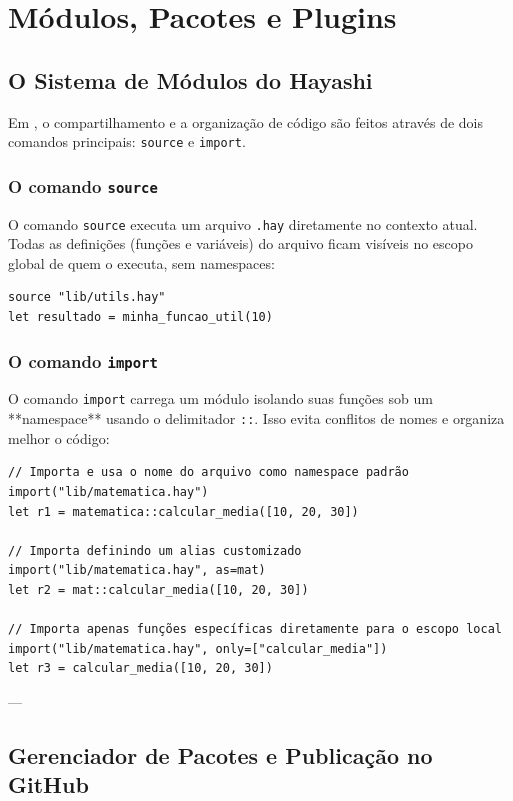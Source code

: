 \chapter{Módulos, Pacotes e Plugins}

\section{O Sistema de Módulos do Hayashi}

Em \hayashi{}, o compartilhamento e a organização de código são feitos através de dois comandos principais: \lstinline{source} e \lstinline{import}.

\subsection{O comando \texttt{source}}
O comando \lstinline{source} executa um arquivo \texttt{.hay} diretamente no contexto atual. Todas as definições (funções e variáveis) do arquivo ficam visíveis no escopo global de quem o executa, sem namespaces:

\begin{lstlisting}[caption={Uso básico de source}]
source "lib/utils.hay"
let resultado = minha_funcao_util(10)
\end{lstlisting}

\subsection{O comando \texttt{import}}
O comando \lstinline{import} carrega um módulo isolando suas funções sob um **namespace** usando o delimitador \texttt{::}. Isso evita conflitos de nomes e organiza melhor o código:

\begin{lstlisting}[caption={Importando com namespace}]
// Importa e usa o nome do arquivo como namespace padrão
import("lib/matematica.hay")
let r1 = matematica::calcular_media([10, 20, 30])

// Importa definindo um alias customizado
import("lib/matematica.hay", as=mat)
let r2 = mat::calcular_media([10, 20, 30])

// Importa apenas funções específicas diretamente para o escopo local
import("lib/matematica.hay", only=["calcular_media"])
let r3 = calcular_media([10, 20, 30])
\end{lstlisting}

---

\section{Gerenciador de Pacotes e Publicação no GitHub}

